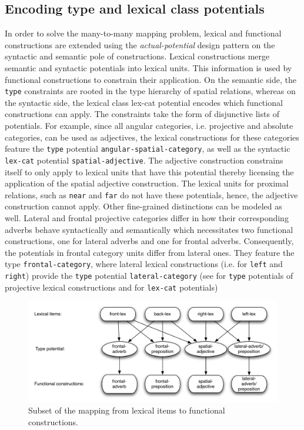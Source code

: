 \subsection{Encoding type and lexical class potentials}
In order to solve the many-to-many mapping problem,
lexical and functional constructions are 
extended using the \emph{actual-potential} design pattern 
on the syntactic and semantic pole of constructions.
Lexical constructions merge semantic and 
syntactic potentials into lexical units. This 
information is used by functional constructions 
to constrain their application. On the 
semantic side, the {\footnotesize\tt type} constraints are rooted 
in the type hierarchy of spatial relations, whereas on the
syntactic side, the lexical class {lex-cat} potential encodes
which functional constructions can apply. 
The constraints take the form of disjunctive lists of potentials.
For example, since all angular categories, i.e. projective and absolute
categories, can be used as adjectives, the lexical constructions for these 
categories feature the {\footnotesize\tt type} potential {\footnotesize\tt angular-spatial-category}, 
as well as the syntactic {\footnotesize\tt lex-cat} potential 
{\footnotesize\tt spatial-adjective}. The adjective construction
constrains itself to only apply to lexical units that have this 
potential thereby licensing the application of the spatial adjective
construction. The lexical units for proximal relations, such
as {\footnotesize\tt near} and {\footnotesize\tt far} do not have these potentials, hence,
the adjective construction cannot apply.
Other fine-grained distinctions can be modeled as well.
Lateral and frontal projective categories differ in how their 
corresponding adverbs behave syntactically and semantically
which necessitates two functional constructions, one for lateral adverbs and one 
for frontal adverbs. Consequently, the potentials in frontal category units 
differ from lateral ones. They feature the type {\footnotesize\tt frontal-category}, 
where lateral lexical constructions (i.e. for {\footnotesize\tt left} and {\footnotesize\tt right})
provide the {\footnotesize\tt type} potential {\footnotesize\tt lateral-category}
(see  
for {\footnotesize\tt type}  potentials of projective lexical constructions and
  for {\footnotesize\tt lex-cat} potentials)

\begin{figure}
\includegraphics[width=\columnwidth]{figs/lexicals-lex-cat-potentials-cats}
\caption{Subset of the mapping from lexical items to functional constructions.}
\label{f:lexicals-lex-cat-potentials-cats}
\end{figure}

